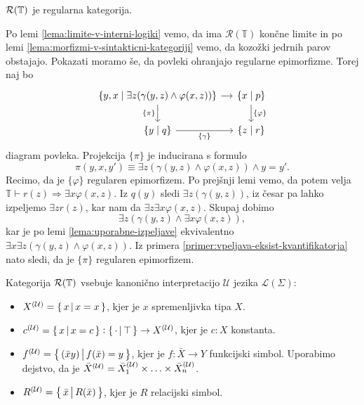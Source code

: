 \documentclass[../kategoricna_logika.tex]{subfiles}
\begin{document}
\begin{trditev}
  $\mathcal{R}(\T)$ je regularna kategorija.
\end{trditev}
\begin{dokaz}
  Po lemi \ref{lema:limite-v-interni-logiki} vemo, da ima
  $\mathcal{R}(\mathbb{T})$ končne limite in po lemi
  \ref{lema:morfizmi-v-sintakticni-kategoriji} vemo, da kozožki
  jedrnih parov obstajajo. Pokazati moramo še, da povleki ohranjajo
  regularne epimorfizme.  Torej naj bo
  \begin{equation*}
    \begin{tikzcd}[column sep=small]
      \{y,x \mid \exists z(\gamma(y,z) \land \varphi(x,z))\} \ar[d,
      "\{\pi\}"'] \ar[r] &
      \{ x \mid p\} \ar[d, "\{\varphi\}"] \\
      \{y \mid q\} \ar[r, "\{\gamma\}"'] & \{z \mid r\}
    \end{tikzcd}
  \end{equation*}
  diagram povleka. Projekcija $\{\pi\}$ je inducirana s formulo
  \[ \pi(y,x,y') \equiv \exists z(\gamma(y,z) \land \varphi(x,z))
    \land y=y'.\] Recimo, da je $\{\varphi\}$ regularen
  epimorfizem. Po prejšnji lemi vemo, da potem velja
  $\mathbb{T} \vdash r(z) \Rightarrow \exists x \varphi(x,z)$.  Iz
  $q(y)$ sledi $\exists z(\gamma(y,z))$, iz česar pa lahko izpeljemo
  $\exists z r(z)$, kar nam da $\exists z \exists x
  \varphi(x,z)$. Skupaj dobimo
  \[ \exists z(\gamma(y,z) \land \exists x \varphi(x,z)),\] kar je po
  lemi \ref{lema:uporabne-izpeljave} ekvivalentno
  $\exists x \exists z(\gamma(y,z) \land \varphi(x,z))$.  Iz primera
  \ref{primer:vpeljava-eksist-kvantifikatorja} nato sledi, da je
  $\{\pi\}$ regularen epimorfizem.
\end{dokaz}
\begin{definicija}
  Kategorija $\mathcal{R}(\T)$ vsebuje kanonično interpretacijo
  $\mathcal{U}$ jezika $\mathcal{L}(\Sigma)$:
  \begin{itemize}
  \item $\interp[\mathcal{U}]{X} = \set{x\,\middle|\, x = x}$, kjer je
    $x$ spremenljivka tipa $X$.
  \item
    $\interp[\mathcal{U}]{c} = \set{x\,\middle|\, x = c} :
    \set{\cdot\,\middle|\, \top} \to \interp[\mathcal{U}]{X}$, kjer je
    $c:X$ konstanta.
  \item
    $\interp[\mathcal{U}]{f} = \set{(\bar{x}y)\,\middle|\, f(\bar{x})
      = y}$, kjer je $f : \bar{X}\to Y$ funkcijski simbol. Uporabimo
    dejstvo, da je
    $\bar{X}^{(\mathcal{U})} = \interp[\mathcal{U}]{\bar{X}_1} \times
    \ldots \times \interp[\mathcal{U}]{\bar{X}_n}$.
  \item
    $\interp[\mathcal{U}]{R} = \set{\bar{x}\,\middle|\, R(\bar{x})}$,
    kjer je $R$ relacijski simbol.
  \end{itemize}
\end{definicija}
\end{document}
